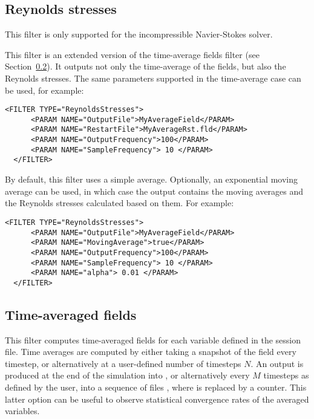 \subsection{Reynolds stresses}\label{filters:ReynoldsStresses}

\begin{notebox}
  This filter is only supported for the incompressible Navier-Stokes solver.
\end{notebox}

This filter is an extended version of the time-average fields filter (see Section~\ref{filters:TimeAveragedFields}). It outputs
not only the time-average of the fields, but also the Reynolds stresses.
The same parameters supported in the time-average case can be used,
for example:

\begin{lstlisting}[style=XMLStyle,gobble=2]
  <FILTER TYPE="ReynoldsStresses">
      <PARAM NAME="OutputFile">MyAverageField</PARAM>
      <PARAM NAME="RestartFile">MyAverageRst.fld</PARAM>
      <PARAM NAME="OutputFrequency">100</PARAM>
      <PARAM NAME="SampleFrequency"> 10 </PARAM>
  </FILTER>
\end{lstlisting}

By default, this filter uses a simple average. Optionally, an exponential
moving average can be used, in which case the output contains the moving
averages and the Reynolds stresses calculated based on them. For example:

\begin{lstlisting}[style=XMLStyle,gobble=2]
  <FILTER TYPE="ReynoldsStresses">
      <PARAM NAME="OutputFile">MyAverageField</PARAM>
      <PARAM NAME="MovingAverage">true</PARAM>
      <PARAM NAME="OutputFrequency">100</PARAM>
      <PARAM NAME="SampleFrequency"> 10 </PARAM>
      <PARAM NAME="alpha"> 0.01 </PARAM>
  </FILTER>
\end{lstlisting}

\subsection{Time-averaged fields}\label{filters:TimeAveragedFields}

This filter computes time-averaged fields for each variable defined in the
session file. Time averages are computed by either taking a snapshot of the
field every timestep, or alternatively at a user-defined number of timesteps
$N$. An output is produced at the end of the simulation into
, or alternatively every $M$ timesteps as defined by the
user, into a sequence of files , where \inltt{*} is
replaced by a counter. This latter option can be useful to observe statistical
convergence rates of the averaged variables.

